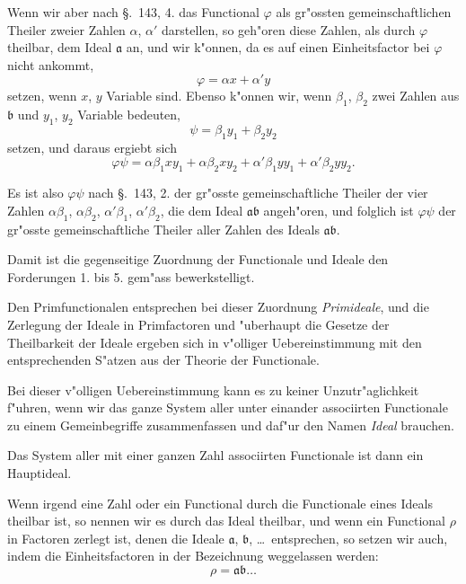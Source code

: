 \documentclass[12pt,a4paper]{article}
\theoremstyle{definition}
\begin{document}
Wenn wir aber nach \S.~143, 4. das Functional $\varphi$ als gr"ossten gemeinschaftlichen Theiler zweier Zahlen $\alpha$, $\alpha'$ darstellen, so geh"oren diese Zahlen, als durch $\varphi$ theilbar, dem Ideal $\mathfrak{a}$ an, und wir k"onnen, da es auf einen Einheitsfactor bei $\varphi$ nicht ankommt,
\begin{equation}
\varphi = \alpha x + \alpha' y
\end{equation}
setzen, wenn $x$, $y$ Variable sind. Ebenso k"onnen wir, wenn $\beta_1$, $\beta_2$ zwei Zahlen aus $\mathfrak{b}$ und $y_1$, $y_2$ Variable bedeuten,
\begin{equation}
\psi = \beta_1 y_1 + \beta_2 y_2
\end{equation}
setzen, und daraus ergiebt sich
\begin{equation}
\varphi\psi = \alpha\beta_1 x y_1 + \alpha\beta_2 x y_2 + \alpha'\beta_1 y y_1 + \alpha'\beta_2 y y_2.
\end{equation}

Es ist also $\varphi\psi$ nach \S.~143, 2. der gr"osste gemeinschaftliche Theiler der vier Zahlen $\alpha\beta_1$, $\alpha\beta_2$, $\alpha'\beta_1$, $\alpha'\beta_2$, die dem Ideal $\mathfrak{a}\mathfrak{b}$ angeh"oren, und folglich ist $\varphi\psi$ der gr"osste gemeinschaftliche Theiler aller Zahlen des Ideals $\mathfrak{a}\mathfrak{b}$.

Damit ist die gegenseitige Zuordnung der Functionale und Ideale den Forderungen 1. bis 5. gem"ass bewerkstelligt.

Den Primfunctionalen entsprechen bei dieser Zuordnung \emph{Primideale}, und die Zerlegung der Ideale in Primfactoren und "uberhaupt die Gesetze der Theilbarkeit der Ideale ergeben sich in v"olliger Uebereinstimmung mit den entsprechenden S"atzen aus der Theorie der Functionale.

Bei dieser v"olligen Uebereinstimmung kann es zu keiner Unzutr"aglichkeit f"uhren, wenn wir das ganze System aller unter einander associirten Functionale zu einem Gemeinbegriffe zusammenfassen und daf"ur den Namen \emph{Ideal} brauchen.

Das System aller mit einer ganzen Zahl associirten Functionale ist dann ein Hauptideal.

Wenn irgend eine Zahl oder ein Functional durch die Functionale eines Ideals theilbar ist, so nennen wir es durch das Ideal theilbar, und wenn ein Functional $\rho$ in Factoren zerlegt ist, denen die Ideale $\mathfrak{a}$, $\mathfrak{b}$, \dots\ entsprechen, so setzen wir auch, indem die Einheitsfactoren in der Bezeichnung weggelassen werden:
\begin{equation}
\rho = \mathfrak{a}\mathfrak{b}\dots
\end{equation}
\end{document}
